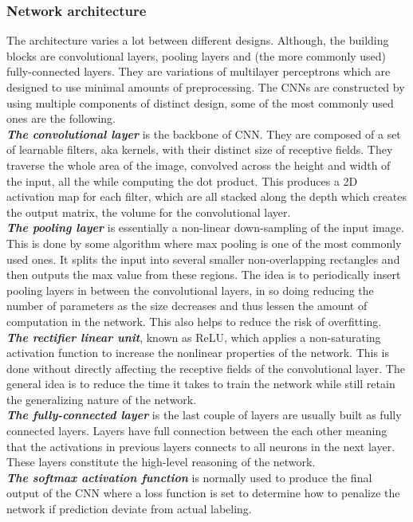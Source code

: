 \subsubsection{Network architecture}
The architecture varies a lot between different designs. Although, the building blocks are convolutional layers, pooling layers and (the more commonly used) fully-connected layers. They are variations of multilayer perceptrons which are designed to use minimal amounts of preprocessing. The CNNs are constructed by using multiple components of distinct design, some of the most commonly used ones are the following. \\

\textbf{\emph{The convolutional layer}} is the backbone of  CNN. They are composed of a set of learnable filters, aka kernels, with their distinct size of receptive fields. They traverse the whole area of the image, convolved across the height and width of the input, all the while computing the dot product. This produces a 2D activation map for each filter, which are all stacked along the depth which creates the output matrix, the volume for the convolutional layer. \\
\textbf{\emph{The pooling layer}} is essentially a non-linear down-sampling of the input image. This is done by some algorithm where max pooling is one of the most commonly used ones. It splits the input into several smaller non-overlapping rectangles and then outputs the max value from these regions. The idea is to periodically insert pooling layers in between the convolutional layers, in so doing reducing the number of parameters as the size decreases and thus lessen the amount of computation in the network. This also helps to reduce the risk of overfitting. \\
 \textbf{\emph{The rectifier linear unit}}, known as ReLU, which applies a non-saturating activation function to increase the nonlinear properties of the network. This is done without directly affecting the receptive fields of the convolutional layer. The general idea is to reduce the time it takes to train the network while still retain the generalizing nature of the network. \\
\textbf{\emph{The fully-connected layer}}  is the last couple of layers are usually built as fully connected layers. Layers have full connection between the each other meaning that the activations in previous layers connects to all neurons in the next layer. These layers constitute the high-level reasoning of the network. \\
\textbf{\emph{The softmax activation function}} is normally used to produce the final output of the CNN where a loss function is set to determine how to penalize the network if prediction deviate from actual labeling. \\

